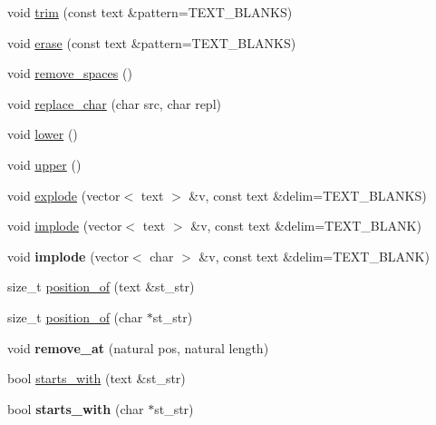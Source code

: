 \begin{DoxyCompactItemize}
void \hyperlink{classez_1_1objects_1_1Text_a9462f3c187757fb60a496976ecd0fc16}{trim} (const text \&pattern=T\+E\+X\+T\+\_\+\+B\+L\+A\+N\+KS)
\item 
void \hyperlink{classez_1_1objects_1_1Text_aa40fc7443ff1b821b6080698560ab1f3}{erase} (const text \&pattern=T\+E\+X\+T\+\_\+\+B\+L\+A\+N\+KS)
\item 
void \hyperlink{classez_1_1objects_1_1Text_aa88b2079bd804dd601d95d889c806d07}{remove\+\_\+spaces} ()
\item 
void \hyperlink{classez_1_1objects_1_1Text_a282fb4b0d7acbcc2f7d00eea501fc43f}{replace\+\_\+char} (char src, char repl)
\item 
void \hyperlink{classez_1_1objects_1_1Text_a0daced300441edc38c7ec5d4dae02a3e}{lower} ()
\item 
void \hyperlink{classez_1_1objects_1_1Text_aa9428ce5c5bec16c8566a47e7d44b00a}{upper} ()
\item 
void \hyperlink{classez_1_1objects_1_1Text_ac93f001a43898fef37edf0daa67012ef}{explode} (vector$<$ text $>$ \&v, const text \&delim=T\+E\+X\+T\+\_\+\+B\+L\+A\+N\+KS)
\item 
void \hyperlink{classez_1_1objects_1_1Text_a8ada334f8279bd08c287d8d51787c4f0}{implode} (vector$<$ text $>$ \&v, const text \&delim=T\+E\+X\+T\+\_\+\+B\+L\+A\+NK)
\item 
\mbox{\label{classez_1_1objects_1_1Text_ab81721d304b1487e0e6c3be87cce9706}} 
void {\bfseries implode} (vector$<$ char $>$ \&v, const text \&delim=T\+E\+X\+T\+\_\+\+B\+L\+A\+NK)
\item 
size\+\_\+t \hyperlink{classez_1_1objects_1_1Text_a3284d557f746aae28ac3a40c419d08b9}{position\+\_\+of} (text \&st\+\_\+str)
\item 
size\+\_\+t \hyperlink{classez_1_1objects_1_1Text_a23753760d867a42e2ddcf86a2845ff81}{position\+\_\+of} (char $\ast$st\+\_\+str)
\item 
\mbox{\label{classez_1_1objects_1_1Text_ac1363c20b6588a9a2c8cf8c9976cba96}} 
void {\bfseries remove\+\_\+at} (natural pos, natural length)
\item 
bool \hyperlink{classez_1_1objects_1_1Text_a030ba4985d1a369418ca3167ac01fcd7}{starts\+\_\+with} (text \&st\+\_\+str)
\item 
\mbox{\label{classez_1_1objects_1_1Text_a3a586f7ad03d0c18cb62dfd37ce1f1e9}} 
bool {\bfseries starts\+\_\+with} (char $\ast$st\+\_\+str)

\end{DoxyCompactItemize}
